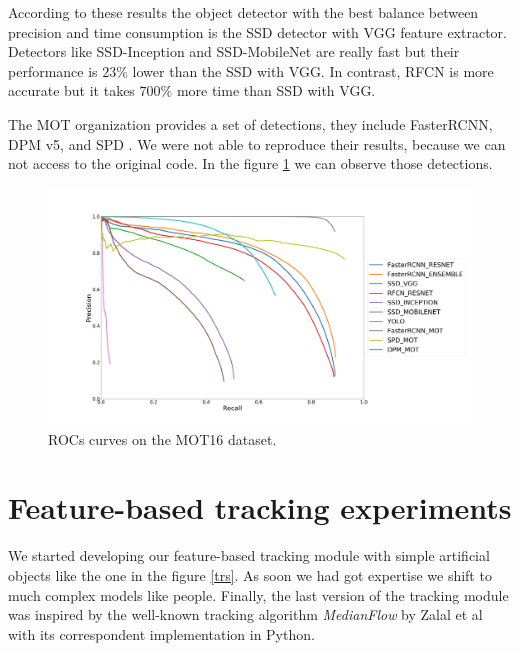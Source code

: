 According to these results the object detector with the best balance between precision and time consumption is the SSD detector with VGG feature extractor. Detectors like SSD-Inception and SSD-MobileNet are really fast but their performance is $23 \%$ lower than the SSD with VGG. In contrast, RFCN is more accurate but it takes $700 \%$ more time than SSD with VGG.


The MOT organization provides a set of detections, they include FasterRCNN, DPM v5, and SPD \cite{spd}. We were not able to reproduce their results, because we can not access to the original code. In the figure \ref{experimDet3} we can observe those detections.




\begin{figure}[H]
\centering         
\includegraphics[width=0.9\linewidth]{evaluacionObject/motdetece.png}
\caption{ROCs curves on the MOT16 dataset.} \label{experimDet3}
\end{figure}


\section{Feature-based tracking experiments}\label{trackingsesad}



We started developing our feature-based tracking module with simple artificial objects like the one in the figure \ref{trs}. As soon we had got expertise we shift to much complex models like people. Finally, the last version of the tracking module was inspired by the well-known tracking algorithm \textit{MedianFlow} by Zalal et al\cite{medianFlow} with its correspondent implementation in Python\cite{medianFlowPython}.
 

